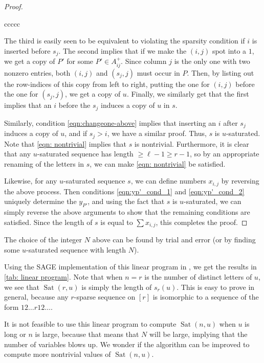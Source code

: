 \documentclass[12pt]{amsart}
\DeclareMathOperator{\Sat}{Sat}
\theoremstyle{definition}
\numberwithin{equation}{section}
\numberwithin{table}{thm}
\begin{document}
\begin{proof}
\begin{table}[ht]
\begin{NiceTabular}{ccccc}
    \end{NiceTabular}
    \vskip 4pt
    \caption{Exact Values of $\Sat(n,u)$}
    \label{tab: linear program}
\end{table}

    The third is easily seen to be equivalent to violating the sparsity condition if $i$ is inserted before $s_{j}$. The second implies that if we make the $(i,j)$ spot into a $1$, we get a copy of $P'$ for some $P'\in A_{ij}^+$. Since column $j$ is the only one with two nonzero entries, both $(i,j)$ and $(s_j,j)$ must occur in $P$. Then, by listing out the row-indices of this copy from left to right, putting the one for $(i,j)$ before the one for $(s_j,j)$, we get a copy of $u$. Finally, we similarly get that the first implies that an $i$ before the $s_j$ induces a copy of $u$ in $s$. 
    
    Similarly, condition \eqref{eqn:changeone-above} implies that inserting an $i$ after $s_{j}$ induces a copy of $u$, and if $s_j>i$, we have a similar proof. Thus, $s$ is $u$-saturated. Note that \eqref{eqn: nontrivial} implies that $s$ is nontrivial. Furthermore, it is clear that any $u$-saturated sequence has length $\ge \ell -1 \ge r-1$, so by an appropriate renaming of the letters in $s$, we can make \eqref{eqn: nontrivial} be satisfied.

    Likewise, for any $u$-saturated sequence $s$, we can define numbers $x_{i,j}$ by reversing the above process. Then conditions \eqref{eqn:yp'_cond_1} and \eqref{eqn:yp'_cond_2} uniquely determine the $y_{P'}$, and using the fact that $s$ is $u$-saturated, we can simply reverse the above arguments to show that the remaining conditions are satisfied. Since the length of $s$ is equal to $\sum x_{i,j}$, this completes the proof.
\end{proof} 
The choice of the integer $N$ above can be found by trial and error (or by finding some $u$-saturated sequence with length $N$). 

Using the SAGE implementation of this linear program in \cite{kanungocode}, we get the results in \cref{tab: linear program}. Note that when $n=r$ is the number of distinct letters of $u$, we see that $\Sat(r,u)$ is simply the length of $s_r(u)$. This is easy to prove in general, because any $r$-sparse sequence on $[r]$ is isomorphic to a sequence of the form $12\dots r12\dots $.


It is not feasible to use this linear program to compute $\Sat(n,u)$ when $u$ is long or $n$ is large, because that means that $N$ will be large, implying that the number of variables blows up. We wonder if the algorithm can be improved to compute more nontrivial values of $\Sat(n,u)$. 
\end{document}
